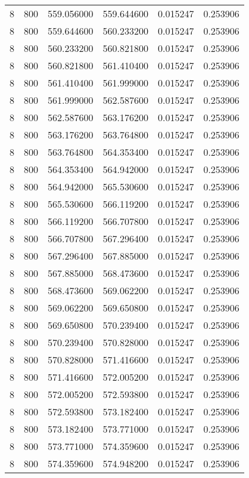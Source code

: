 \begin{longtable}{rrrrrr}
8 & 800 & 559.056000 & 559.644600 & 0.015247 & 0.253906 \\
8 & 800 & 559.644600 & 560.233200 & 0.015247 & 0.253906 \\
8 & 800 & 560.233200 & 560.821800 & 0.015247 & 0.253906 \\
8 & 800 & 560.821800 & 561.410400 & 0.015247 & 0.253906 \\
8 & 800 & 561.410400 & 561.999000 & 0.015247 & 0.253906 \\
8 & 800 & 561.999000 & 562.587600 & 0.015247 & 0.253906 \\
8 & 800 & 562.587600 & 563.176200 & 0.015247 & 0.253906 \\
8 & 800 & 563.176200 & 563.764800 & 0.015247 & 0.253906 \\
8 & 800 & 563.764800 & 564.353400 & 0.015247 & 0.253906 \\
8 & 800 & 564.353400 & 564.942000 & 0.015247 & 0.253906 \\
8 & 800 & 564.942000 & 565.530600 & 0.015247 & 0.253906 \\
8 & 800 & 565.530600 & 566.119200 & 0.015247 & 0.253906 \\
8 & 800 & 566.119200 & 566.707800 & 0.015247 & 0.253906 \\
8 & 800 & 566.707800 & 567.296400 & 0.015247 & 0.253906 \\
8 & 800 & 567.296400 & 567.885000 & 0.015247 & 0.253906 \\
8 & 800 & 567.885000 & 568.473600 & 0.015247 & 0.253906 \\
8 & 800 & 568.473600 & 569.062200 & 0.015247 & 0.253906 \\
8 & 800 & 569.062200 & 569.650800 & 0.015247 & 0.253906 \\
8 & 800 & 569.650800 & 570.239400 & 0.015247 & 0.253906 \\
8 & 800 & 570.239400 & 570.828000 & 0.015247 & 0.253906 \\
8 & 800 & 570.828000 & 571.416600 & 0.015247 & 0.253906 \\
8 & 800 & 571.416600 & 572.005200 & 0.015247 & 0.253906 \\
8 & 800 & 572.005200 & 572.593800 & 0.015247 & 0.253906 \\
8 & 800 & 572.593800 & 573.182400 & 0.015247 & 0.253906 \\
8 & 800 & 573.182400 & 573.771000 & 0.015247 & 0.253906 \\
8 & 800 & 573.771000 & 574.359600 & 0.015247 & 0.253906 \\
8 & 800 & 574.359600 & 574.948200 & 0.015247 & 0.253906 \\

\end{longtable}
